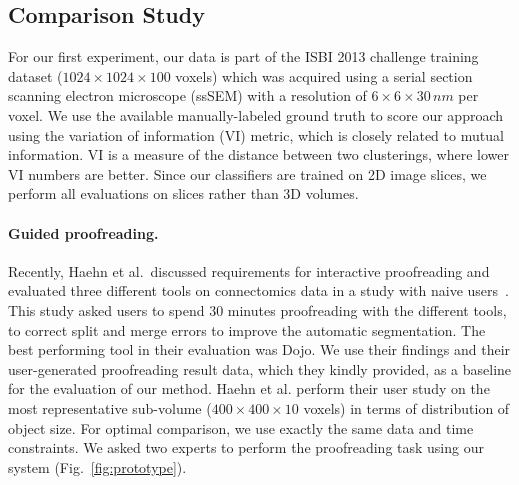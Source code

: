 \subsection{Comparison Study}
\label{sec:comparisonstudy}
For our first experiment, our data is part of the ISBI 2013 challenge training dataset ($1024\times1024\times100$ voxels) which was acquired using a serial section scanning electron microscope (ssSEM) with a resolution of $6\times6\times30\, nm$ per voxel. We use the available manually-labeled ground truth to score our approach using the variation of information (VI) metric, which is closely related to mutual information. VI is a measure of the distance between two clusterings, where lower VI numbers are better. Since our classifiers are trained on 2D image slices, we perform all evaluations on slices rather than 3D volumes.



\paragraph{Guided proofreading.}
Recently, Haehn et al.~discussed requirements for interactive proofreading and evaluated three different tools on connectomics data in a study with naive users~\cite{haehn_dojo_2014}. This study asked users to spend 30 minutes proofreading with the different tools, to correct split and merge errors to improve the automatic segmentation. The best performing tool in their evaluation was Dojo. We use their findings and their user-generated proofreading result data, which they kindly provided, as a baseline for the evaluation of our method.
Haehn et al. perform their user study on the most representative sub-volume ($400\times400\times10$ voxels) in terms of distribution of object size. For optimal comparison, we use exactly the same data and time constraints. We asked two experts to perform the proofreading task using our system (Fig.~\ref{fig:prototype}).

